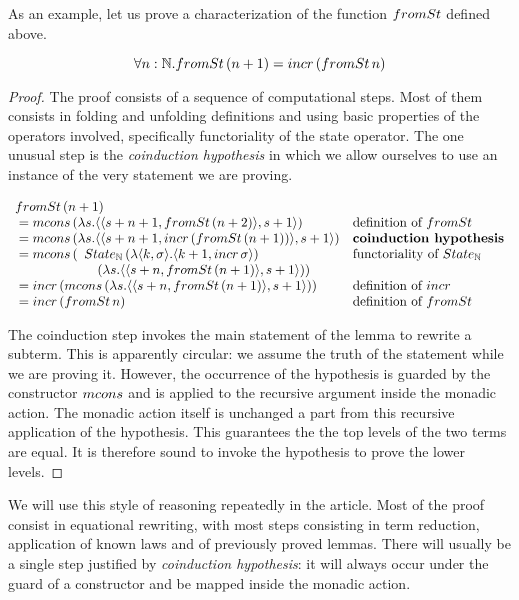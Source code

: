 As an example,
let us prove a characterization of the function $\frominc$ defined above.
\begin{lemma}
$$
\forall n:\nat. \frominc\,(n+1) = \incr\,(\frominc\,n)
$$
\end{lemma}
\begin{proof}
The proof consists of a sequence of computational steps.
Most of them consists in folding and unfolding definitions and using basic properties of the operators involved, specifically functoriality of the state operator.
The one unusual step is the {\em coinduction hypothesis} in which we allow ourselves to use an instance of the very statement we are proving.

$$
\begin{array}{ll}
\frominc\,(n+1)\\
{}= \mcons\, (\lambda s. \pair{\pair{s+n+1}{\frominc\, (n + 2)}}{s + 1})
  & \mbox{definition of }\frominc\\
{}= \mcons\, (\lambda s. \pair{\pair{s+n+1}{\incr\,(\frominc\,(n+1))}}{s + 1})
  & \mbox{\bf coinduction hypothesis}\\
{}= \mcons\,(
    \begin{array}[t]{l}
    \state_\nat\,(\lambda \pair{k}{\sigma}. \pair{k+1}{\incr\,\sigma})\\
    \quad (\lambda s. \pair{\pair{s+n}{\frominc\,(n+1)}}{s + 1}))
    \end{array}
  & \mbox{functoriality of }\state_\nat\\
{}= \incr\,(\mcons\,(\lambda s. \pair{\pair{s+n}{\frominc\,(n+1)}}{s + 1}))
  & \mbox{definition of }\incr\\
{}= \incr\,(\frominc\,n)
  & \mbox{definition of }\frominc
\end{array}
$$

The coinduction step invokes the main statement of the lemma to rewrite a subterm.
This is apparently circular: we assume the truth of the statement while we are proving it.
However, the occurrence of the hypothesis is guarded by the constructor $\mcons$ and is applied to the recursive argument inside the monadic action.
The monadic action itself is unchanged a part from this recursive application of the hypothesis.
This guarantees the the top levels of the two terms are equal.
It is therefore sound to invoke the hypothesis to prove the lower levels.
\end{proof}

We will use this style of reasoning repeatedly in the article.
Most of the proof consist in equational rewriting, with most steps consisting in term reduction, application of known laws and of previously proved lemmas.
There will usually be a single step justified by {\em coinduction hypothesis}: it will always occur under the guard of a constructor and be mapped inside the monadic action.


